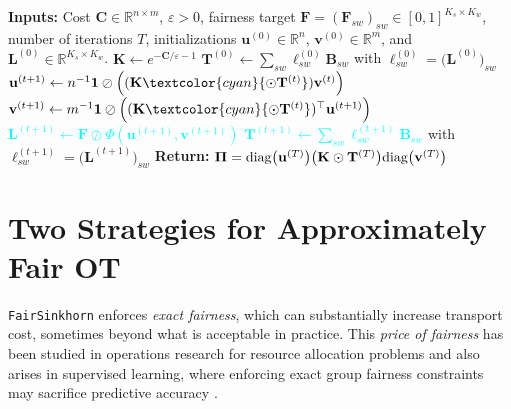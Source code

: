 \documentclass{article}
\theoremstyle{definition}
\newcommand{\RETURN}{\textbf{\STATE Return: }}
\begin{document}
\begin{algorithm}[t]
\begin{algorithmic}[1]
\STATE \textbf{Inputs:} Cost $\mathbf{C}\in\mathbb{R}^{n\times m}$, $\varepsilon>0$, fairness target $\mathbf{F} = (\mathbf{F}_{sw})_{sw} \in [0,1]^{K_s \times K_w}$, number of iterations $T$, initializations $\mathbf{u}^{(0)}\in\mathbb{R}^n$, $\mathbf{v}^{(0)}\in\mathbb{R}^m$, and $\mathbf{L}^{(0)}\in\mathbb{R}^{K_s\times K_w}$.
\STATE $\mathbf{K} \leftarrow   e^{-\mathbf{C}/\varepsilon-1}$ 
\STATE $\mathbf{T}^{(0)} \leftarrow \sum_{sw} \ell^{(0)}_{sw} \mathbf{B}_{sw}$ with $\ell^{(0)}_{sw} = \big(\mathbf{L}^{(0)}\big)_{sw}$
  \STATE $\mathbf{u}^{(t+1)} \leftarrow n^{-1}\mathbf{1}\oslash\Big((\mathbf{K} \textcolor{cyan}{\odot \mathbf{T}^{(t)}})\mathbf{v}^{(t)}\Big)$
  \STATE $\mathbf{v}^{(t+1)} \leftarrow m^{-1}\mathbf{1}\oslash\Big((\mathbf{K} \textcolor{cyan}{\odot \mathbf{T}^{(t)}})^\top \mathbf{u}^{(t+1)}\Big)$
  \STATE \textcolor{cyan}{$\mathbf{L}^{(t+1)} \leftarrow \mathbf{F} \oslash \Phi(\mathbf{u}^{(t+1)},\mathbf{v}^{(t+1)})$} 
\STATE \textcolor{cyan}{$\mathbf{T}^{(t+1)}\! \leftarrow \! \sum_{sw} \ell^{(t+1)}_{sw} \mathbf{B}_{sw}$} with $\ell^{(t+1)}_{sw} \!=\! \big(\mathbf{L}^{(t+1)}\big)_{sw}$
\ENDFOR
\RETURN $\mathbf{\Pi} = \textnormal{diag}\big(\mathbf{u}^{(T)}\big)\big( \mathbf{K}\odot \mathbf{T}^{(T)}\big)\textnormal{diag}\big(\mathbf{v}^{(T)}\big)$
\end{algorithmic}
\caption{\texttt{FairSinkhorn} algorithm to solve \eqref{eq:pure_empirical_fairness}}
\label{alg:fairsinkhorn}
\end{algorithm}    
\section{Two Strategies for Approximately Fair OT}
\texttt{FairSinkhorn} enforces \emph{exact fairness}, which can substantially increase transport cost, sometimes beyond what is acceptable in practice.
This \textit{price of fairness} has been studied in operations research for resource allocation problems \citep{bertsimas2011price} and also arises in supervised learning, where enforcing exact group fairness constraints may sacrifice predictive accuracy \citep{zhao2019inherent}.
\end{document}
